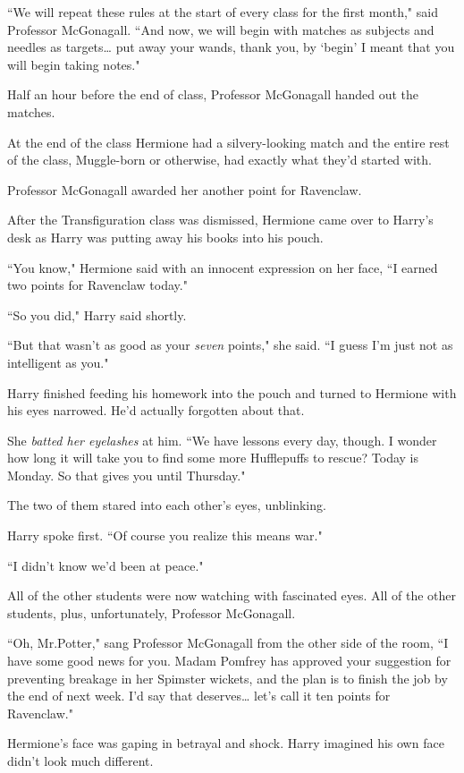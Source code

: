 ``We will repeat these rules at the start of every class for the first month," said Professor McGonagall. ``And now, we will begin with matches as subjects and needles as targets{\ldots} put away your wands, thank you, by `begin' I meant that you will begin taking notes."

Half an hour before the end of class, Professor McGonagall handed out the matches.

At the end of the class Hermione had a silvery-looking match and the entire rest of the class, Muggle-born or otherwise, had exactly what they'd started with.

Professor McGonagall awarded her another point for Ravenclaw.

\later

After the Transfiguration class was dismissed, Hermione came over to Harry's desk as Harry was putting away his books into his pouch.

``You know," Hermione said with an innocent expression on her face, ``I earned two points for Ravenclaw today."

``So you did," Harry said shortly.

``But that wasn't as good as your \emph{seven} points," she said. ``I guess I'm just not as intelligent as you."

Harry finished feeding his homework into the pouch and turned to Hermione with his eyes narrowed. He'd actually forgotten about that.

She \emph{batted her eyelashes} at him. ``We have lessons every day, though. I wonder how long it will take you to find some more Hufflepuffs to rescue? Today is Monday. So that gives you until Thursday."

The two of them stared into each other's eyes, unblinking.

Harry spoke first. ``Of course you realize this means war."

``I didn't know we'd been at peace."

All of the other students were now watching with fascinated eyes. All of the other students, plus, unfortunately, Professor McGonagall.

``Oh, Mr.\?Potter," sang Professor McGonagall from the other side of the room, ``I have some good news for you. Madam Pomfrey has approved your suggestion for preventing breakage in her Spimster wickets, and the plan is to finish the job by the end of next week. I'd say that deserves{\ldots} let's call it ten points for Ravenclaw."

Hermione's face was gaping in betrayal and shock. Harry imagined his own face didn't look much different.

